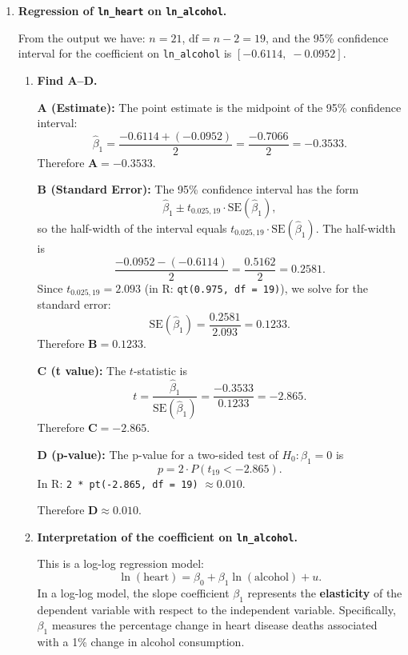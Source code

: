 \documentclass[12pt]{article}
\begin{document}
\begin{enumerate}
\item \textbf{Regression of \texttt{ln\_heart} on \texttt{ln\_alcohol}.}

From the output we have: $n = 21$, $\text{df} = n - 2 = 19$, and the 95\% confidence interval for the coefficient on \verb!ln_alcohol! is $[-0.6114,\; -0.0952]$.

\begin{enumerate}

\item \textbf{Find A--D.}

\textbf{A (Estimate):} The point estimate is the midpoint of the 95\% confidence interval:
$$
\hat{\beta}_1 = \frac{-0.6114 + (-0.0952)}{2} = \frac{-0.7066}{2} = -0.3533.
$$
Therefore $\mathbf{A = -0.3533}$.

\bigskip

\textbf{B (Standard Error):} The 95\% confidence interval has the form
$$
\hat{\beta}_1 \pm t_{0.025, 19} \cdot \text{SE}(\hat{\beta}_1),
$$
so the half-width of the interval equals $t_{0.025, 19} \cdot \text{SE}(\hat{\beta}_1)$. The half-width is
$$
\frac{-0.0952 - (-0.6114)}{2} = \frac{0.5162}{2} = 0.2581.
$$
Since $t_{0.025, 19} = 2.093$ (in R: \verb!qt(0.975, df = 19)!), we solve for the standard error:
$$
\text{SE}(\hat{\beta}_1) = \frac{0.2581}{2.093} = 0.1233.
$$
Therefore $\mathbf{B = 0.1233}$.

\bigskip

\textbf{C (t value):} The $t$-statistic is
$$
t = \frac{\hat{\beta}_1}{\text{SE}(\hat{\beta}_1)} = \frac{-0.3533}{0.1233} = -2.865.
$$
Therefore $\mathbf{C = -2.865}$.

\bigskip

\textbf{D (p-value):} The p-value for a two-sided test of $H_0\colon \beta_1 = 0$ is
$$
p = 2 \cdot P(t_{19} < -2.865).
$$
In R: \verb!2 * pt(-2.865, df = 19)! $\approx 0.010$.

Therefore $\mathbf{D \approx 0.010}$.

\bigskip

\item \textbf{Interpretation of the coefficient on \texttt{ln\_alcohol}.}

This is a log-log regression model:
$$
\ln(\text{heart}) = \beta_0 + \beta_1 \ln(\text{alcohol}) + u.
$$
In a log-log model, the slope coefficient $\beta_1$ represents the \textbf{elasticity} of the dependent variable with respect to the independent variable. Specifically, $\beta_1$ measures the percentage change in heart disease deaths associated with a 1\% change in alcohol consumption.


\end{enumerate}
\end{enumerate}
\end{document}
